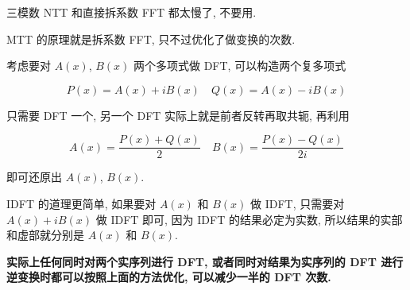 三模数 NTT 和直接拆系数 FFT 都太慢了, 不要用.

MTT 的原理就是拆系数 FFT, 只不过优化了做变换的次数.

考虑要对 $A(x)$, $B(x)$ 两个多项式做 DFT, 可以构造两个复多项式

$$ P(x) = A(x) + iB(x) \quad Q(x) = A(x) - iB(x) $$

只需要 DFT 一个, 另一个 DFT 实际上就是前者反转再取共轭, 再利用

$$ A(x) = \frac {P(x) + Q(x)} 2 \quad B(x) = \frac {P(x) - Q(x)} {2i} $$

即可还原出 $A(x)$, $B(x)$.

IDFT 的道理更简单, 如果要对 $A(x)$ 和 $B(x)$ 做 IDFT, 只需要对 $A(x) + i B(x)$ 做 IDFT 即可, 因为 IDFT 的结果必定为实数, 所以结果的实部和虚部就分别是 $A(x)$ 和 $B(x)$.

\textbf{实际上任何同时对两个实序列进行 DFT, 或者同时对结果为实序列的 DFT 进行逆变换时都可以按照上面的方法优化, 可以减少一半的 DFT 次数.}

\inputminted{cpp}{../src/math/MTT.cpp}